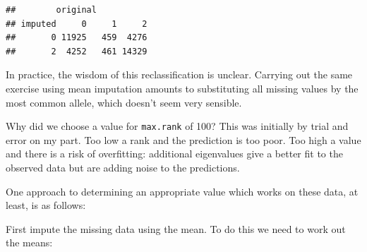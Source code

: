 \documentclass[
]{book}
\newenvironment{Shaded}{\begin{snugshade}}{\end{snugshade}}
\newcommand{\AttributeTok}[1]{\textcolor[rgb]{0.77,0.63,0.00}{#1}}
\newcommand{\CommentTok}[1]{\textcolor[rgb]{0.56,0.35,0.01}{\textit{#1}}}
\newcommand{\ControlFlowTok}[1]{\textcolor[rgb]{0.13,0.29,0.53}{\textbf{#1}}}
\newcommand{\DecValTok}[1]{\textcolor[rgb]{0.00,0.00,0.81}{#1}}
\newcommand{\FloatTok}[1]{\textcolor[rgb]{0.00,0.00,0.81}{#1}}
\newcommand{\FunctionTok}[1]{\textcolor[rgb]{0.00,0.00,0.00}{#1}}
\newcommand{\NormalTok}[1]{#1}
\newcommand{\OtherTok}[1]{\textcolor[rgb]{0.56,0.35,0.01}{#1}}
\newcommand{\SpecialCharTok}[1]{\textcolor[rgb]{0.00,0.00,0.00}{#1}}
\begin{document}
\begin{verbatim}
##        original
## imputed     0     1     2
##       0 11925   459  4276
##       2  4252   461 14329
\end{verbatim}

In practice, the wisdom of this reclassification is unclear. Carrying out the same exercise using mean imputation amounts to substituting all missing values by the most common allele, which doesn't seem very sensible.

Why did we choose a value for \texttt{max.rank} of 100? This was initially by trial and error on my part. Too low a rank and the prediction is too poor. Too high a value and there is a risk of overfitting: additional eigenvalues give a better fit to the observed data but are adding noise to the predictions.

One approach to determining an appropriate value which works on these data, at least, is as follows:

First impute the missing data using the mean. To do this we need to work out the means:

\begin{Shaded}
\end{Shaded}
\end{document}
